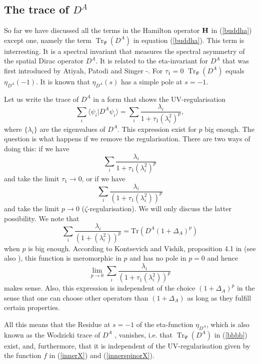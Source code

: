 \documentclass[letterpaper,11pt]{article}
\newcommand{\Tr}{\operatorname{Tr}}
\begin{document}
\subsection{The trace of $D^A$ }

So far we have discussed all the terms in the Hamilton operator ${\bf H}$ in (\ref{buddha}) except one, namely the term $\Tr_\Psi (D^A)$ in equation (\ref{buddha}).
This term  is interresting. It is a spectral invariant that measures the spectral asymmetry of the spatial Dirac operator $D^A$. It is related to the eta-invariant for $D^A$ that was first introduced by Atiyah, Patodi and Singer \cite{Atiyah}-\cite{AtiyahIII}. For $\tau_1=0$ $\Tr_\Psi (D^A)$ equals $\eta_{D^A}(-1)$. It is known \cite{AtiyahIII} that $\eta_{D^A}(s)$ has a simple pole at $s=-1$. 

Let us write the trace of $D^A$ in a form that shows the UV-regularisation
\begin{equation}
    \sum_i \langle \psi_i \vert D^A \psi_i \rangle = \sum_i \frac{\lambda_i}{1+\tau_1 (\lambda_i^2)^p},
\end{equation}
where $\{\lambda_i\}$ are the eigenvalues of $D^A$. This expression exist for $p$ big enough. The question is what happens if we remove the regularisation. There are two ways of doing this: if we have
\begin{equation}
     \sum_i \frac{\lambda_i}{1+\tau_1 (\lambda_i^2)^p}
\end{equation}
and take the limit $\tau_1\rightarrow 0$, or if we have
\begin{equation}
     \sum_i \frac{\lambda_i}{(1+\tau_1 (\lambda_i^2))^p}
\end{equation}
and take the limit $p\rightarrow 0$ ($\zeta$-regularisation).
We will only discuss the latter possibility. We note that
\begin{equation}
     \sum_i \frac{\lambda_i}{(1+ (\lambda_i^2))^p}
     = \mbox{Tr} \left( D^A (1+ \Delta_A )^p\right)
\end{equation}
when $p$ is big enough. According to Kontsevich and Vishik, proposition 4.1 in \cite{Kontsevich1} (see also \cite{Kontsevich2}), this function is meromorphic in $p$ and has no pole in $p=0$ and hence 
$$
\lim_{p\rightarrow 0} \sum_i \frac{\lambda_i}{(1+\tau_1 (\lambda_i^2))^p}
$$
makes sense. Also, this expression is independent of the choice $(1+\Delta_A)^p$ in the sense that one can choose other operators than $(1+\Delta_A)$ as long as they fulfill certain properties. 

All this means that the Residue at $s=-1$ of the eta-function $\eta_{D^A}$, which is also known as the Wodzicki trace of $D^A$ \cite{wodzicki}, vanishes, i.e. that $\Tr_\Psi (D^A)$ in (\ref{bbbb}) exist, and, furthermore, that it is independent of the UV-regularisation given by the function $f$ in (\ref{innerX}) and (\ref{innerspinorX}).\\
\end{document}
